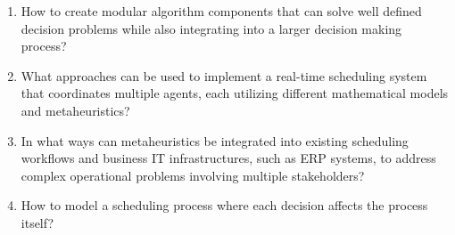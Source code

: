 \begin{enumerate}[]
	\item How to create modular algorithm components that can solve well defined decision problems while also integrating into a larger decision making process?
    \item What approaches can be used to implement a real-time scheduling system that coordinates multiple agents, each utilizing different mathematical models and metaheuristics?
    \item In what ways can metaheuristics be integrated into existing scheduling workflows and business IT infrastructures, such as ERP systems, to address complex operational problems involving multiple stakeholders?
    \item How to model a scheduling process where each decision affects the process itself?
\end{enumerate}

